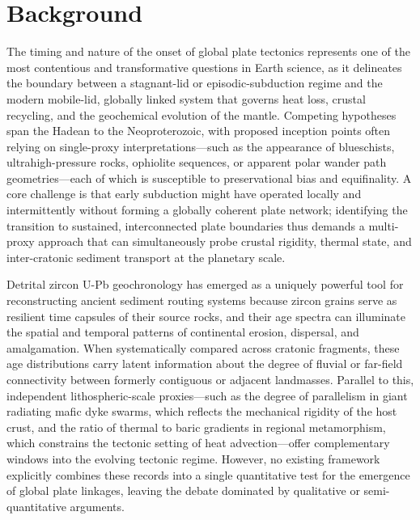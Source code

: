 \documentclass{article}
\begin{document}
\section{Background}
The timing and nature of the onset of global plate tectonics represents one of the most contentious and transformative questions in Earth science, as it delineates the boundary between a stagnant-lid or episodic-subduction regime and the modern mobile-lid, globally linked system that governs heat loss, crustal recycling, and the geochemical evolution of the mantle. Competing hypotheses span the Hadean to the Neoproterozoic, with proposed inception points often relying on single-proxy interpretations—such as the appearance of blueschists, ultrahigh-pressure rocks, ophiolite sequences, or apparent polar wander path geometries—each of which is susceptible to preservational bias and equifinality. A core challenge is that early subduction might have operated locally and intermittently without forming a globally coherent plate network; identifying the transition to sustained, interconnected plate boundaries thus demands a multi-proxy approach that can simultaneously probe crustal rigidity, thermal state, and inter-cratonic sediment transport at the planetary scale.

Detrital zircon U-Pb geochronology has emerged as a uniquely powerful tool for reconstructing ancient sediment routing systems because zircon grains serve as resilient time capsules of their source rocks, and their age spectra can illuminate the spatial and temporal patterns of continental erosion, dispersal, and amalgamation. When systematically compared across cratonic fragments, these age distributions carry latent information about the degree of fluvial or far-field connectivity between formerly contiguous or adjacent landmasses. Parallel to this, independent lithospheric-scale proxies—such as the degree of parallelism in giant radiating mafic dyke swarms, which reflects the mechanical rigidity of the host crust, and the ratio of thermal to baric gradients in regional metamorphism, which constrains the tectonic setting of heat advection—offer complementary windows into the evolving tectonic regime. However, no existing framework explicitly combines these records into a single quantitative test for the emergence of global plate linkages, leaving the debate dominated by qualitative or semi-quantitative arguments.
\end{document}
